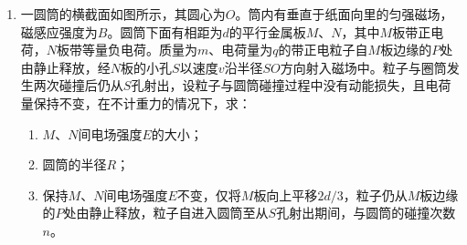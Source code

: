 \begin{enumerate}[leftmargin=0em]
\begin{enumerate}
\end{enumerate}
\begin{figure}[h!]
\flushright

\end{figure}




\newpage
\item
{}
一圆筒的横截面如图所示，其圆心为$ O $。筒内有垂直于纸面向里的匀强磁场，磁感应强度为$ B $。圆筒下面有相距为$ d $的平行金属板$ M $、$ N $，其中$ M $板带正电荷，$ N $板带等量负电荷。质量为$ m $、电荷量为$ q $的带正电粒子自$ M $板边缘的$ P $处由静止释放，经$ N $板的小孔$ S $以速度$ v $沿半径$ SO $方向射入磁场中。粒子与圈筒发生两次碰撞后仍从$ S $孔射出，设粒子与圆筒碰撞过程中没有动能损失，且电荷量保持不变，在不计重力的情况下，求：
\begin{enumerate}
\renewcommand{\labelenumi}{\arabic{enumi}.}
\item
$ M $、$ N $间电场强度$ E $的大小；
\item 
圆筒的半径$ R $；
\item 
保持$ M $、$ N $间电场强度$ E $不变，仅将$ M $板向上平移$ 2d/3 $，粒子仍从$ M $板边缘的$ P $处由静止释放，粒子自进入圆筒至从$ S $孔射出期间，与圆筒的碰撞次数$ n $。



\end{enumerate}
\begin{figure}[h!]
\flushright

\end{figure}


\end{enumerate}
